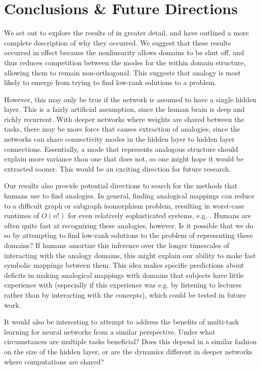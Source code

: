 \documentclass[11pt]{article}
\begin{document}
\section{Conclusions \& Future Directions}
We set out to explore the results of \citet{Lampinen2017} in greater detail, and have outlined a more complete description of why they occurred. We suggest that these results occurred in effect because the nonlinearity allows domains to be shut off, and thus reduces competition between the modes for the within domain structure, allowing them to remain non-orthogonal. This suggests that analogy is most likely to emerge from trying to find low-rank solutions to a problem.\par
However, this may only be true if the network is assumed to have a single hidden layer. This is a fairly artificial assumption, since the human brain is deep and richly recurrent. With deeper networks where weights are shared between the tasks, there may be more force that causes extraction of analogies, since the networks can share connectivity modes in the hidden layer to hidden layer connections. Essentially, a mode that represents analogous structure should explain more variance than one that does not, so one might hope it would be extracted sooner. This would be an exciting direction for future research.  \par
Our results also provide potential directions to search for the methods that humans use to find analogies. In general, finding analogical mappings can reduce to a difficult graph or subgraph isomorphism problem, resulting in worst-case runtimes of \(O(n!)\) for even relatively sophisticated systems, e.g. \citet{Falkenhainer1989}. Humans are often quite fast at recognizing these analogies, however. Is it possible that we do so by attempting to find low-rank solutions to the problem of representing these domains? If humans amortize this inference over the longer timescales of interacting with the analogy domains, this might explain our ability to make fast symbolic mappings between them. This idea makes specific predictions about deficits in making analogical mappings with domains that subjects have little experience with (especially if this experience was e.g. by listening to lectures rather than by interacting with the concepts), which could be tested in future work. \par
It would also be interesting to attempt to address the benefits of multi-task learning for neural networks from a similar perspective. Under what circumstances are multiple tasks beneficial? Does this depend in a similar fashion on the size of the hidden layer, or are the dynamics different in deeper networks where computations are shared? \par 
\end{document}
